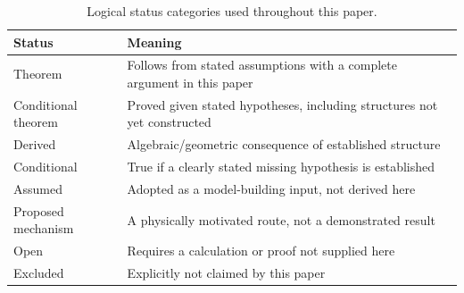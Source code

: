 \documentclass[11pt]{article}
\theoremstyle{canonmath}
\theoremstyle{canonpostulate}
\theoremstyle{canonclaim}
\begin{document}
\begin{table}[H]
\centering
\caption{Logical status categories used throughout this paper.}
\begin{tabular}{@{}ll@{}}
\toprule
\textbf{Status} & \textbf{Meaning} \\
\midrule
Theorem & Follows from stated assumptions with a complete argument in this paper \\
Conditional theorem & Proved given stated hypotheses, including structures not yet constructed \\
Derived & Algebraic/geometric consequence of established structure \\
Conditional & True if a clearly stated missing hypothesis is established \\
Assumed & Adopted as a model-building input, not derived here \\
Proposed mechanism & A physically motivated route, not a demonstrated result \\
Open & Requires a calculation or proof not supplied here \\
Excluded & Explicitly not claimed by this paper \\
\bottomrule
\end{tabular}
\end{table}
\end{document}
